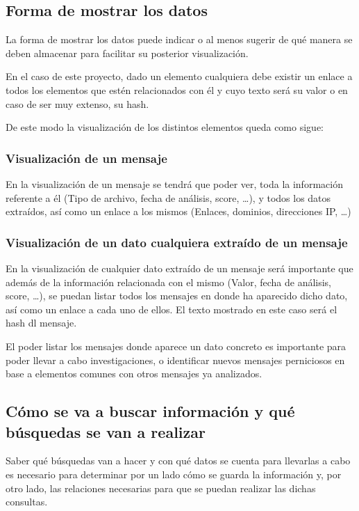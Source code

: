 \subsection{Forma de mostrar los datos}
La forma de mostrar los datos puede indicar o al menos sugerir de qué manera se deben almacenar para facilitar su posterior visualización.

En el caso de este proyecto, dado un elemento cualquiera debe existir un enlace a todos los elementos que estén relacionados con él y cuyo texto será su valor o en caso de ser muy extenso, su hash.

De este modo la visualización de los distintos elementos queda como sigue: 

\subsubsection{Visualización de un mensaje}
En la visualización de un mensaje se tendrá que poder ver, toda la información referente a él (Tipo de archivo, fecha de análisis, score, …), y todos los datos extraídos, así como un enlace a los mismos (Enlaces, dominios, direcciones IP, …)

\subsubsection{Visualización de un dato cualquiera extraído de un mensaje}
En la visualización de cualquier dato extraído de un mensaje será importante que además de la información relacionada con el mismo (Valor, fecha de análisis, score, …), se puedan listar todos los mensajes en donde ha aparecido dicho dato, así como un enlace a cada uno de ellos. El texto mostrado en este caso será el hash dl mensaje.

El poder listar los mensajes donde aparece un dato concreto es importante para poder llevar a cabo investigaciones, o identificar nuevos mensajes perniciosos en base a elementos comunes con otros mensajes ya analizados.

\subsection{Cómo se va a buscar información y qué búsquedas se van a realizar}
Saber qué búsquedas van a hacer y con qué datos se cuenta para llevarlas a cabo es necesario para determinar por un lado cómo se guarda la información y, por otro lado, las relaciones necesarias para que se puedan realizar las dichas consultas.

